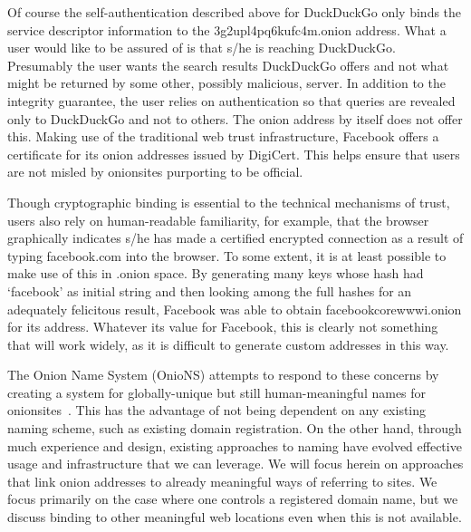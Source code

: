 \documentclass[10pt, conference, compsocconf]{styles/IEEEtran}
\begin{document}
Of course the self-authentication described above 
for DuckDuckGo only binds the
service descriptor information to the 3g2upl4pq6kufc4m.onion
address. What a user would like to be assured of is that s/he is
reaching DuckDuckGo. Presumably the user wants the search results
DuckDuckGo offers and not what might be returned by some other,
possibly malicious, server.  In addition to the integrity guarantee,
the user relies on authentication so that queries are revealed only to
DuckDuckGo and not to others. The onion address by itself does not
offer this. Making use of the traditional web trust infrastructure,
Facebook offers a certificate for its onion addresses
issued by DigiCert.  This helps ensure that users are not misled by
onionsites purporting to be official.

Though cryptographic binding is essential to the technical mechanisms
of trust, users also rely on human-readable familiarity, for example,
that the browser graphically indicates s/he has made a certified
encrypted connection as a result of typing facebook.com into the
browser.  To some extent, it is at least possible to make use of this
in .onion space. By generating many keys whose hash had `facebook' as
initial string and then looking among the full hashes for an
adequately felicitous result, Facebook was able to obtain
facebookcorewwwi.onion for its address. Whatever its value for
Facebook, this is clearly not something that will work widely, as it
is difficult to generate custom addresses in this way. 

The Onion Name System (OnioNS) attempts to respond to these concerns
by creating a system for globally-unique but still human-meaningful
names for onionsites~\cite{vickers-onions}.  This has the advantage of
not being dependent on any existing naming scheme, such as existing
domain registration. On the other hand, through much experience and
design, existing approaches to naming have evolved effective usage and
infrastructure that we can leverage. We will focus herein on
approaches that link onion addresses to already meaningful ways of
referring to sites. We focus primarily on the case where one controls
a registered domain name, but we discuss binding to other meaningful
web locations even when this is not available.

\end{document}
